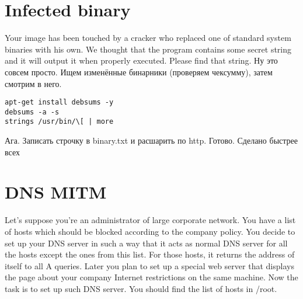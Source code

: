 \documentclass[a4paper,10pt]{report}
\begin{document}
\chapter{Infected binary}
Your image has been touched by a cracker who replaced one of standard system binaries with his own. We thought that the program contains some secret string and it will output it when properly executed. Please find that string.
\newline\newline
Ну это совсем просто. Ищем изменённые бинарники (проверяем чексумму), затем смотрим в него.
\newline
\begin{verbatim}
apt-get install debsums -y
debsums -a -s
strings /usr/bin/\[ | more
\end{verbatim}
Ага. Записать строчку в binary.txt и расшарить по http. Готово.
\newline\newline
Сделано быстрее всех %

\chapter{DNS MITM}
Let's suppose you're an administrator of large corporate network. You have a list of hosts which should be blocked according to the company policy. You decide to set up your DNS server in such a way that it acts as normal DNS server for all the hosts except the ones from this list. For those hosts, it returns the address of itself to all A queries. Later you plan to set up a special web server that displays the page about your company Internet restrictions on the same machine.
\newline
Now the task is to set up such DNS server. You should find the list of hosts in /root.
\newline\newline
\end{document}
